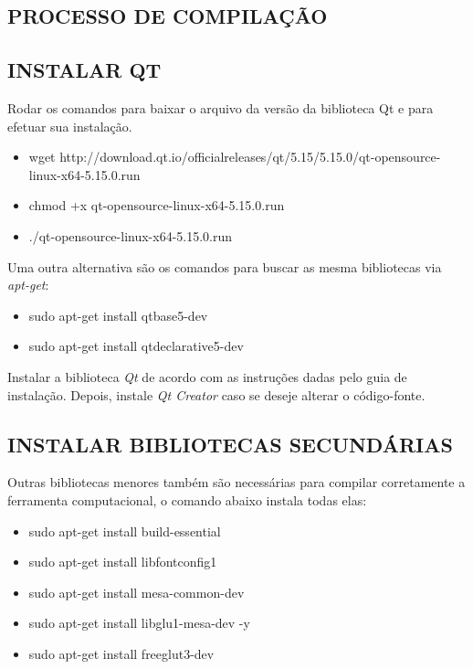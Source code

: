 \begin{appendices}
	\chapter{PROCESSO DE COMPILAÇÃO}\label{annex1}
	\section{INSTALAR QT}\label{qt}
		
		Rodar os comandos para baixar o arquivo da versão da biblioteca Qt e para efetuar sua instalação.
		
	\begin{itemize}
		\item wget http://download.qt.io/official\underline{\space\space}releases/qt/5.15/5.15.0/qt-opensource-linux-x64-5.15.0.run
		\item chmod +x qt-opensource-linux-x64-5.15.0.run
		\item ./qt-opensource-linux-x64-5.15.0.run
	\end{itemize}
	
	
	Uma outra alternativa são os comandos para buscar as mesma bibliotecas via \textit{apt-get}:
	
	\begin{itemize}
		\item sudo apt-get install qtbase5-dev
		\item sudo apt-get install qtdeclarative5-dev
	\end{itemize}

	Instalar a biblioteca \textit{Qt} de acordo com as instruções dadas pelo guia de instalação. Depois, instale \textit{Qt Creator} caso se deseje alterar o código-fonte.
	
	\section{INSTALAR BIBLIOTECAS SECUNDÁRIAS}\label{secondary_libs}
	
	Outras bibliotecas menores também são necessárias para compilar corretamente a ferramenta computacional, o comando abaixo instala todas elas:
	
	\begin{itemize}
		\item sudo apt-get install build-essential
		\item sudo apt-get install libfontconfig1
		\item sudo apt-get install mesa-common-dev
		\item sudo apt-get install libglu1-mesa-dev -y
		\item sudo apt-get install freeglut3-dev
	\end{itemize}
	

\end{appendices}
